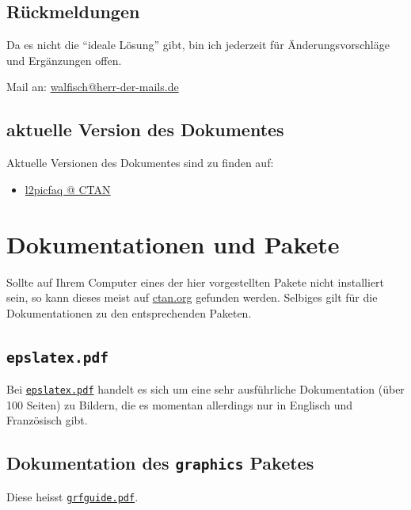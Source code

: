 \documentclass[%
a4paper, %
12pt, %
DIV0, %
final, %
halfparskip %
]{scrartcl} %
\begin{document}
\subsection{Rückmeldungen}
Da es nicht die "`ideale Lösung"' gibt, bin ich jederzeit für Änderungsvorschläge und Ergänzungen offen.

Mail an: \url{walfisch@herr-der-mails.de}


\subsection{aktuelle Version des Dokumentes}
Aktuelle Versionen des Dokumentes sind zu finden auf:%
\begin{itemize}
\item \href{http://www.ctan.org/tex-archive/info/l2picfaq/german/}{l2picfaq @ CTAN}
\end{itemize}


\clearpage




\section{Dokumentationen und Pakete}
Sollte auf Ihrem Computer eines der hier vorgestellten Pakete nicht installiert sein, so kann dieses meist auf \href{http://www.ctan.org}{ctan.org} gefunden werden. Selbiges gilt für die Dokumentationen zu den entsprechenden Paketen.

\subsection{\texttt{epslatex.pdf}}
Bei \href{http://www.ctan.org/tex-archive/info/epslatex/english/epslatex.pdf}{\texttt{epslatex.pdf}} handelt es sich um eine sehr ausführliche Dokumentation (über 100 Seiten) zu Bildern, die es momentan allerdings nur in Englisch und Französisch gibt.

\subsection{Dokumentation des \texttt{graphics} Paketes}
Diese heisst \href{http://mirror.switch.ch/ftp/mirror/tex/macros/latex/required/graphics/grfguide.pdf}{\texttt{grfguide.pdf}}.
\end{document}
